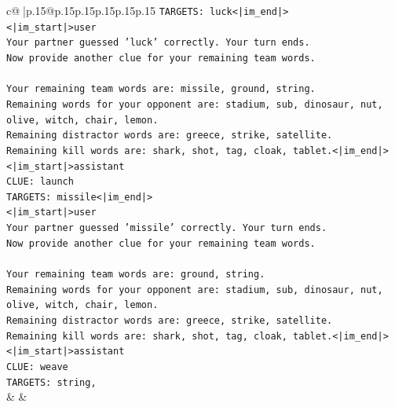 \documentclass{article}
\begin{document}
{\begin{supertabular}{c@{$\;$}|p{.15\linewidth}@{}p{.15\linewidth}p{.15\linewidth}p{.15\linewidth}p{.15\linewidth}p{.15\linewidth}}
{{{\texttt{TARGETS: luck<|im\_end|>} \\
\texttt{<|im\_start|>user} \\
\texttt{Your partner guessed 'luck' correctly. Your turn ends.} \\
\texttt{Now provide another clue for your remaining team words.} \\
\\ 
\texttt{Your remaining team words are: missile, ground, string.} \\
\texttt{Remaining words for your opponent are: stadium, sub, dinosaur, nut, olive, witch, chair, lemon.} \\
\texttt{Remaining distractor words are: greece, strike, satellite.} \\
\texttt{Remaining kill words are: shark, shot, tag, cloak, tablet.<|im\_end|>} \\
\texttt{<|im\_start|>assistant} \\
\texttt{CLUE: launch} \\
\texttt{TARGETS: missile<|im\_end|>} \\
\texttt{<|im\_start|>user} \\
\texttt{Your partner guessed 'missile' correctly. Your turn ends.} \\
\texttt{Now provide another clue for your remaining team words.} \\
\\ 
\texttt{Your remaining team words are: ground, string.} \\
\texttt{Remaining words for your opponent are: stadium, sub, dinosaur, nut, olive, witch, chair, lemon.} \\
\texttt{Remaining distractor words are: greece, strike, satellite.} \\
\texttt{Remaining kill words are: shark, shot, tag, cloak, tablet.<|im\_end|>} \\
\texttt{<|im\_start|>assistant} \\
\texttt{CLUE: weave} \\
\texttt{TARGETS: string,} \\
            }
        }
    }
    & & \\ \\


\end{supertabular}}
\end{document}
